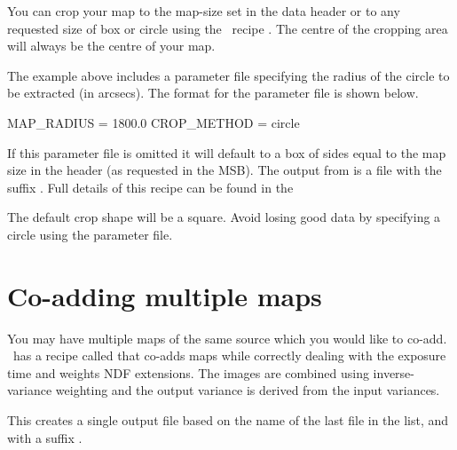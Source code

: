You can crop your map to the map-size set in the data header or to any
requested size of box or circle using the \picard\ recipe
.
The centre of the cropping area will always be the centre of your map.

\begin{terminalv}
\end{terminalv}

The example above includes a parameter file specifying the radius of
the circle to be extracted (in arcsecs).  The format for the parameter
file is shown below.

\begin{terminalv}
MAP_RADIUS = 1800.0
CROP_METHOD = circle
\end{terminalv}


If this parameter file is omitted it will default to a box of sides
equal to the map size in the header (as requested in the MSB). The
output from  is a file with the suffix
. Full details of this recipe can be found in the

\begin{tip}
  The default crop shape will be a square. Avoid losing good data by
  specifying a circle using the parameter file.
\end{tip}

\section{Co-adding multiple maps}
\label{sec:coadd}

You may have multiple maps of the same source which you would like to
co-add. \picard\ has a recipe called
that co-adds maps while correctly dealing with the exposure time and
weights NDF extensions. The images are combined using inverse-variance
weighting and the output variance is derived from the input variances.

\begin{terminalv}
\end{terminalv}

This creates a single output file based on the name of the last file
in the list, and with a suffix .

